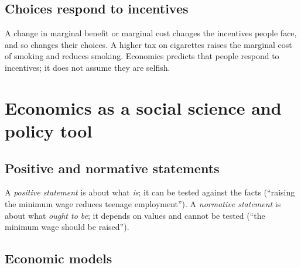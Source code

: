 \begin{center}
\end{center}

\subsection{Choices respond to incentives}

A change in marginal benefit or marginal cost changes the incentives people face, and so
changes their choices. A higher tax on cigarettes raises the marginal cost of smoking and
reduces smoking. Economics predicts that people respond to incentives; it does not
assume they are selfish.

\section{Economics as a social science and policy tool}

\subsection{Positive and normative statements}

\begin{definition}
A \emph{positive statement} is about what \emph{is}; it can be tested against the facts
(``raising the minimum wage reduces teenage employment''). A \emph{normative statement}
is about what \emph{ought to be}; it depends on values and cannot be tested (``the
minimum wage should be raised'').
\end{definition}

\subsection{Economic models}

